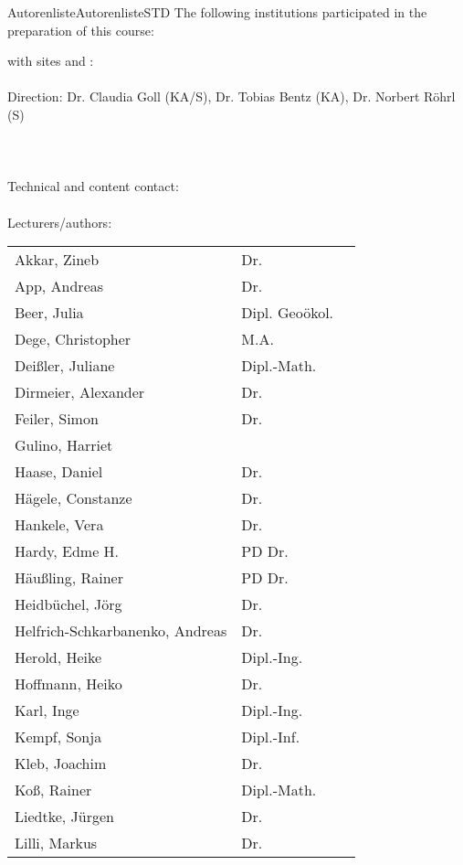\begin{MXContent}{Autorenliste}{Autorenliste}{STD}
The following institutions participated in the preparation of this course:

 with sites  and :\\
\ \\
Direction: Dr. Claudia Goll (KA/S), Dr. Tobias Bentz (KA), Dr. Norbert Röhrl (S)\\ \ \\
\ \\ \ \\
Technical and content contact: 
\ \\ \ \\
Lecturers/authors:\\
\begin{tabular}{lll}
Akkar, Zineb&Dr.& \\
App, Andreas&Dr.& \\
Beer, Julia&Dipl. Geoökol.& \\
Dege, Christopher&M.A.& \\
Deißler, Juliane&Dipl.-Math.& \\
Dirmeier, Alexander&Dr.& \\
Feiler, Simon&Dr.& \\
Gulino, Harriet& \\
Haase, Daniel&Dr.& \\
Hägele, Constanze&Dr.& \\
Hankele, Vera&Dr.&\\
Hardy, Edme H.&PD Dr.& \\
Häußling, Rainer&PD Dr.& \\
Heidbüchel, Jörg&Dr.&\\
Helfrich-Schkarbanenko, Andreas&Dr.& \\
Herold, Heike&Dipl.-Ing.&\\
Hoffmann, Heiko&Dr.&\\
Karl, Inge&Dipl.-Ing.& \\
Kempf, Sonja&Dipl.-Inf.& \\
Kleb, Joachim&Dr.& \\
Koß, Rainer&Dipl.-Math.& \\
Liedtke, Jürgen&Dr.&\\
Lilli, Markus&Dr.& \\

\end{tabular}
\end{MXContent}
